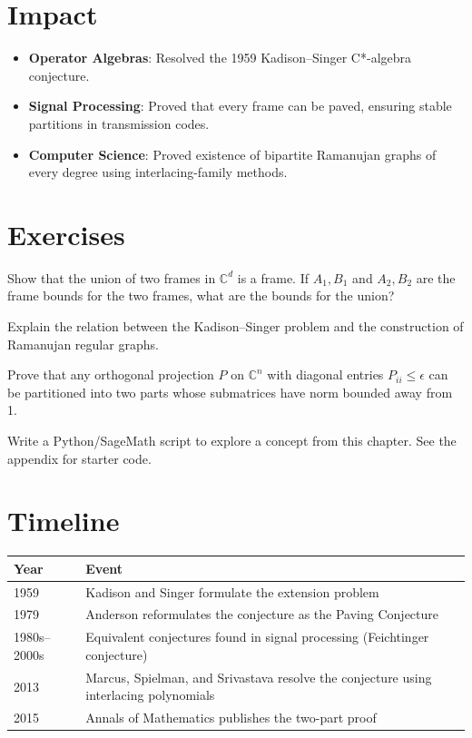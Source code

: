 \section{Impact}
\begin{itemize}
\item \textbf{Operator Algebras}: Resolved the 1959 Kadison--Singer C*-algebra conjecture.
\item \textbf{Signal Processing}: Proved that every frame can be paved, ensuring stable partitions in transmission codes.
\item \textbf{Computer Science}: Proved existence of bipartite Ramanujan graphs of every degree using interlacing-family methods.
\end{itemize}

\section{Exercises}

\begin{exercise}[Basic]
Show that the union of two frames in $\mathbb{C}^d$ is a frame. If $A_1, B_1$ and $A_2, B_2$ are the frame bounds for the two frames, what are the bounds for the union?
\end{exercise}

\begin{exercise}[Intermediate]
Explain the relation between the Kadison--Singer problem and the construction of Ramanujan regular graphs.
\end{exercise}

\begin{exercise}[Challenge]
Prove that any orthogonal projection $P$ on $\mathbb{C}^n$ with diagonal entries $P_{ii} \leq \epsilon$ can be partitioned into two parts whose submatrices have norm bounded away from 1.
\end{exercise}

\begin{exercise}[Computational]
Write a Python/SageMath script to explore a concept from this chapter. See the appendix for starter code.
\end{exercise}

\section{Timeline}

\begin{tabularx}{\linewidth}{lX}
\toprule
\textbf{Year} & \textbf{Event} \\ \midrule
1959 & Kadison and Singer formulate the extension problem \cite{kadison1959} \\ 
1979 & Anderson reformulates the conjecture as the Paving Conjecture \cite{anderson1979} \\ 
1980s--2000s & Equivalent conjectures found in signal processing (Feichtinger conjecture) \\ 
2013 & Marcus, Spielman, and Srivastava resolve the conjecture using interlacing polynomials \cite{marcus2015a, marcus2015b} \\ 
2015 & Annals of Mathematics publishes the two-part proof \\ \bottomrule
\end{tabularx}


